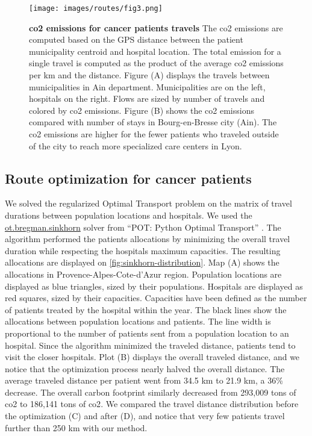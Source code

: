 \begin{figure}[h!]
    \texttt{[image: images/routes/fig3.png]}
    \centering
    \caption{ \textbf{\ac{co2} emissions for cancer patients travels} The
        \ac{co2} emissions are computed based on the GPS distance between the
        patient municipality centroid and hospital location. The total emission
        for a single travel is computed as the product of the average \ac{co2}
        emissions per km and the distance. Figure (A) displays the travels
        between municipalities in Ain department. Municipalities are on the
        left, hospitals on the right. Flows are sized by number of travels and
        colored by \ac{co2} emissions. Figure (B) shows the \ac{co2} emissions
        compared with number of stays in Bourg-en-Bresse city (Ain). The
        \ac{co2} emissions are higher for the fewer patients who traveled
        outside of the city to reach more specialized care centers in Lyon. }
    \label{fig:routes-co2-emissions}
\end{figure}

\subsection{Route optimization for cancer patients}

We solved the regularized Optimal Transport problem on the matrix of travel
durations between population locations and hospitals. We used the
\href{https://pythonot.github.io/gen_modules/ot.bregman.html#ot.bregman.sinkhorn}{ot.bregman.sinkhorn}
solver from ``POT: Python Optimal Transport'' \cite{flamary_pot_2021}. The
algorithm performed the patients allocations by minimizing the overall travel
duration while respecting the hospitals maximum capacities. The resulting
allocations are displayed on \cref{fig:sinkhorn-distribution}. Map (A) shows the
allocations in Provence-Alpes-Cote-d'Azur region. Population locations are
displayed as blue triangles, sized by their populations. Hospitals are displayed
as red squares, sized by their capacities. Capacities have been defined as the
number of patients treated by the hospital within the year. The black lines show
the allocations between population locations and patients. The line width is
proportional to the number of patients sent from a population location to an
hospital. Since the algorithm minimized the traveled distance, patients tend to
visit the closer hospitals. Plot
(B) displays the overall traveled distance, and we notice that the optimization
process nearly halved the overall distance. The average traveled distance per
patient went from 34.5 km to 21.9 km, a 36\% decrease. The overall carbon
footprint similarly decreased from 293,009 tons of \ac{co2} to 186,141 tons of
\ac{co2}. We compared the travel distance distribution before the optimization
(C) and after (D), and notice that very few patients travel further than 250 km
with our method.


